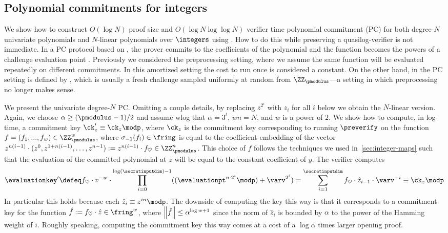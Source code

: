 \subsection{Polynomial commitments for integers}
\label{sec:pc}

We show how to construct $O(\log N)$ proof size and $O(\log N \log\log N)$ verifier time polynomial commitment (PC) for both degree-$N$ univariate polynomials and $N$-linear polynomials over $\integers$ using \sys. How to do this while preserving a quasilog-verifier is not immediate. In a PC protocol based on \sys, the prover commits to the coefficients of the polynomial and the function \function becomes the powers of a challenge evaluation point \evaluationpt. Previously we considered the preprocessing setting, where we assume the same function will be evaluated repeatedly on different commitments. In this amortized setting the cost to run \preverify once is considered a constant. On the other hand, in the PC setting \function is defined by \evaluationpt, which is usually a fresh challenge sampled uniformly at random from $\ZZ_\pmodulus$---a setting in which preprocessing no longer makes sense.

We present the univariate degree-$N$ PC. Omitting a couple details, by replacing $z^{2^i}$ with $z_i$ for all $i$ below we obtain the $N$-linear version. Again, we choose $\alpha \geq (\pmodulus-1)/2$ and assume wlog that $\alpha = 3^t$, $wn = N$, and $w$ is a power of $2$. We show how to compute, in log-time, a commitment key $\ck'_z \equiv \ck_z \modp$, where $\ck_z$ is the commitment key corresponding to running $\preverify$ on the function $f = (f_1,...,f_w) \in \ZZ_{\pmodulus}^w$, where $\sigma_{{-}1}(f_i) \in \fring$ is equal to the coefficient embedding of the vector $z^{n(i-1)} \cdot (z^{0}, z^{1+n(i-1)}, \dotsc, z^{n-1}) := z^{n(i-1)} \cdot f_{\heartsuit} \in \ZZ_{\pmodulus}^n$. This choice of $f$ follows the techniques we used in~\cref{sec:integer-maps} such that the evaluation of the committed polynomial at $z$ will be equal to the constant coefficient of $y$. The verifier computes
\[
\evaluationkey'
\defeq f_{\heartsuit} \cdot v^{-w} \cdot \prod_{i=0}^{\log(\secretinputdim)-1} ((\evaluationpt^{n\cdot 2^{i}} \modp) + \varv^{2^i}) = \sum_{i=1}^{\secretinputdim} f_{\heartsuit} \cdot \hat{z}_{i-1} \cdot \varv^{-i} \equiv \ck_z \modp
\]
In particular this holds because each $\hat{z}_i \equiv z^{in} \modp$. The downside of computing the key this way is that it corresponds to a commitment key for the function $\hat{f} := f_\heartsuit \cdot \hat{z} \in \fring^w$, where $\left\lVert \hat{f} \right\rVert \leq \alpha^{\log w+1}$ since the norm of $\hat{z}_i$ is bounded by $\alpha$ to the power of the Hamming weight of $i$. Roughly speaking, computing the commitment key this way comes at a cost of a $\log \alpha$ times larger opening proof.


